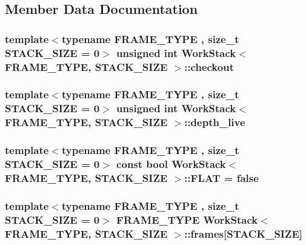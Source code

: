 \subsection{Member Data Documentation}
\hypertarget{structWorkStack_a9d601145d872243d3b6370c5e5bf1e34}{
\subsubsection[{checkout}]{\setlength{\rightskip}{0pt plus 5cm}template$<$typename F\-R\-A\-M\-E\-\_\-\-T\-Y\-P\-E , size\-\_\-t S\-T\-A\-C\-K\-\_\-\-S\-I\-Z\-E = 0$>$ unsigned int {\bf Work\-Stack}$<$ F\-R\-A\-M\-E\-\_\-\-T\-Y\-P\-E, S\-T\-A\-C\-K\-\_\-\-S\-I\-Z\-E $>$\-::checkout}}\label{structWorkStack_a9d601145d872243d3b6370c5e5bf1e34}
\hypertarget{structWorkStack_adb939c1d0f197b8c7cb5d8fd4c0b9051}{
\subsubsection[{depth\-\_\-live}]{\setlength{\rightskip}{0pt plus 5cm}template$<$typename F\-R\-A\-M\-E\-\_\-\-T\-Y\-P\-E , size\-\_\-t S\-T\-A\-C\-K\-\_\-\-S\-I\-Z\-E = 0$>$ unsigned int {\bf Work\-Stack}$<$ F\-R\-A\-M\-E\-\_\-\-T\-Y\-P\-E, S\-T\-A\-C\-K\-\_\-\-S\-I\-Z\-E $>$\-::depth\-\_\-live}}\label{structWorkStack_adb939c1d0f197b8c7cb5d8fd4c0b9051}
\hypertarget{structWorkStack_a431ac90dabf554864d52e73c7c90dbe5}{
\subsubsection[{F\-L\-A\-T}]{\setlength{\rightskip}{0pt plus 5cm}template$<$typename F\-R\-A\-M\-E\-\_\-\-T\-Y\-P\-E , size\-\_\-t S\-T\-A\-C\-K\-\_\-\-S\-I\-Z\-E = 0$>$ const bool {\bf Work\-Stack}$<$ F\-R\-A\-M\-E\-\_\-\-T\-Y\-P\-E, S\-T\-A\-C\-K\-\_\-\-S\-I\-Z\-E $>$\-::F\-L\-A\-T = false\hspace{0.3cm}{\ttfamily [static]}}}\label{structWorkStack_a431ac90dabf554864d52e73c7c90dbe5}
\hypertarget{structWorkStack_acd16ce9936822777e6eafead438d3865}{
\subsubsection[{frames}]{\setlength{\rightskip}{0pt plus 5cm}template$<$typename F\-R\-A\-M\-E\-\_\-\-T\-Y\-P\-E , size\-\_\-t S\-T\-A\-C\-K\-\_\-\-S\-I\-Z\-E = 0$>$ F\-R\-A\-M\-E\-\_\-\-T\-Y\-P\-E {\bf Work\-Stack}$<$ F\-R\-A\-M\-E\-\_\-\-T\-Y\-P\-E, S\-T\-A\-C\-K\-\_\-\-S\-I\-Z\-E $>$\-::frames\mbox{[}S\-T\-A\-C\-K\-\_\-\-S\-I\-Z\-E\mbox{]}}}\label{structWorkStack_acd16ce9936822777e6eafead438d3865}
